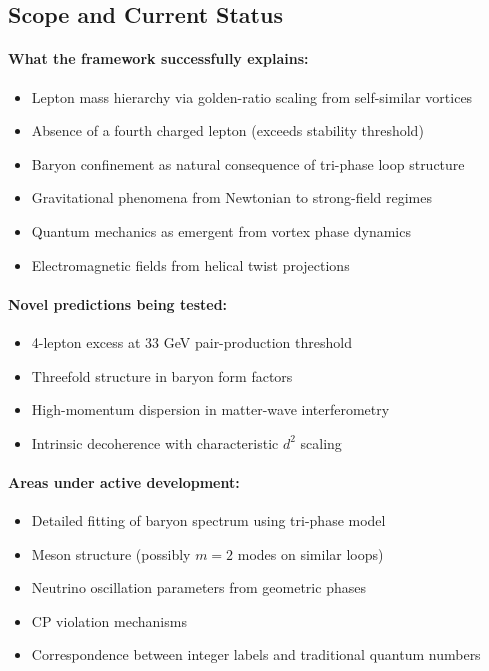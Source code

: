 \subsection{Scope and Current Status}

\paragraph{What the framework successfully explains:}
\begin{itemize}
\item Lepton mass hierarchy via golden-ratio scaling from self-similar vortices
\item Absence of a fourth charged lepton (exceeds stability threshold)
\item Baryon confinement as natural consequence of tri-phase loop structure
\item Gravitational phenomena from Newtonian to strong-field regimes
\item Quantum mechanics as emergent from vortex phase dynamics
\item Electromagnetic fields from helical twist projections
\end{itemize}

\paragraph{Novel predictions being tested:}
\begin{itemize}
\item 4-lepton excess at 33 GeV pair-production threshold
\item Threefold structure in baryon form factors
\item High-momentum dispersion in matter-wave interferometry
\item Intrinsic decoherence with characteristic $d^2$ scaling
\end{itemize}

\paragraph{Areas under active development:}
\begin{itemize}
\item Detailed fitting of baryon spectrum using tri-phase model
\item Meson structure (possibly $m=2$ modes on similar loops)
\item Neutrino oscillation parameters from geometric phases
\item CP violation mechanisms
\item Correspondence between integer labels and traditional quantum numbers
\end{itemize}

